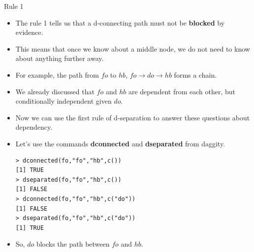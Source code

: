 \documentclass[handout]{beamer}
\begin{document}
\begin{frame}[fragile]{Rule 1}
\scriptsize{
\begin{itemize}

\item The rule 1 tells us that a d-connecting path must not be \textbf{blocked} by evidence.

\item This means that once we know about a middle node, we do not need to know about anything further away.

\item For example, the path from $fo$ to $hb$, $fo \rightarrow do \rightarrow hb$ forms a chain.

\item We already discussed that $fo$ and $hb$ are dependent from each other, but conditionally independent given $do$.

\item Now we can use the first rule of d-separation to answer these questions about dependency.

\item Let's use the commands \textbf{dconnected} and \textbf{dseparated} from daggity.

\begin{verbatim}
> dconnected(fo,"fo","hb",c()) 
[1] TRUE
> dseparated(fo,"fo","hb",c()) 
[1] FALSE
> dconnected(fo,"fo","hb",c("do")) 
[1] FALSE
> dseparated(fo,"fo","hb",c("do")) 
[1] TRUE
\end{verbatim}

\item So, $do$ blocks the path between $fo$ and $hb$.




\end{itemize}

} 

\end{frame}
\end{document}
